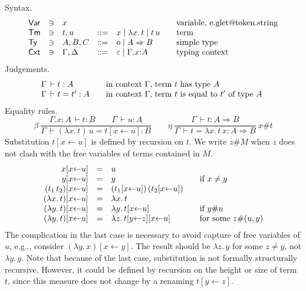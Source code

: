 \documentclass[a4paper,fleqn]{scrartcl}
\makeatletter
\DeclareRobustCommand\onedot{\futurelet\@let@token\@onedot}
\def\@onedot{\ifx\@let@token.\else.\null\fi\xspace}
\def\eg{e.g\onedot}
\newcommand{\To}{\Rightarrow}
\newcommand{\der}{\,\vdash}
\newcommand{\subst}[3]{#3[#2{\leftarrow}#1]}
\newcommand{\substp}[3]{(#3)[#2{\leftarrow}#1]}
\newcommand{\ru}[2]{\dfrac{#1}{#2}}
\newcommand{\nru}[3]{#1\ \ru{#2}{#3}}
\newcommand{\nrux}[4]{\nru{#1}{#2}{#3}\ #4}
\newcommand{\Var}{\mathsf{Var}}
\newcommand{\Ty}{\mathsf{Ty}}
\newcommand{\Tm}{\mathsf{Tm}}
\newcommand{\Cxt}{\mathsf{Cxt}}
\makeatother
\begin{document}
Syntax.
\[
\begin{array}{lllrl@{\qquad}l}
\Var & \ni & x & & & \mbox{variable, \eg string} \\
\Tm & \ni & t,u & ::= & x \mid \lambda x.\,t \mid t \, u & \mbox{term}
  \\
\Ty  & \ni & A,B,C & ::= & o \mid A \To B & \mbox{simple type} \\
\Cxt & \ni & \Gamma, \Delta & ::= & \varepsilon \mid \Gamma.x{:}A
  & \mbox{typing context}\\
\end{array}
\]
Judgements.
\[
\begin{array}{l@{\qquad}l}
  \Gamma \der t : A & \mbox{in context $\Gamma$, term $t$ has type $A$ } \\
  \Gamma \der t = t' : A & \mbox{in context $\Gamma$, term $t$ is equal to $t'$ of type $A$ } \\
\end{array}
\]
Equality rules.
\[
  \nru{\beta
    }{\Gamma.x{:}A \der t : B \qquad \Gamma \der u : A
    }{\Gamma \der (\lambda x.\,t)\,u = \subst u x t : B
    }
\qquad
  \nrux{\eta
   }{\Gamma \der t : A \To B
   }{\Gamma \der t = \lambda x.\,t\,x : A \To B
   }{x\#t}
\]
Substitution $\subst u x t$ is defined by recursion on $t$.
We write $z\#M$ when $z$ does not clash with the free variables of
terms contained in $M$.
\[
\begin{array}{rll@{\qquad}l}
  \subst u x x & = & u \\
  \subst u x y & = & y & \mbox{if } x \not= y \\
  \subst u x {(t_1\,t_2)} & = & (\subst u x {t_1})\, (\subst u x {t_2}) \\
  \subst u x {(\lambda x.\,t)} & = & \lambda x.\,t \\
  \subst u x {(\lambda y.\,t)} & = & \lambda y.\,{\subst u x t}
    & \mbox{if } y\#u \\
  \subst u x {(\lambda y.\,t)} & = & \lambda z.\,{\subst u x {\subst z y t}}
    & \mbox{for some } z\#(u,y) \\
\end{array}
\]
The complication in the last case is necessary to avoid capture of
free variables of $u$, \eg, consider $\substp y x {\lambda y.\,x}$.
The result should be $\lambda z.\,y$ for some $z \not= y$, not
$\lambda y.\,y$.
Note that because of the last case, substitution is not formally
structurally recursive.  However, it could be defined by recursion on
the height or size of term $t$, since this measure does not change by
a renaming $\subst z y t$.
\end{document}
